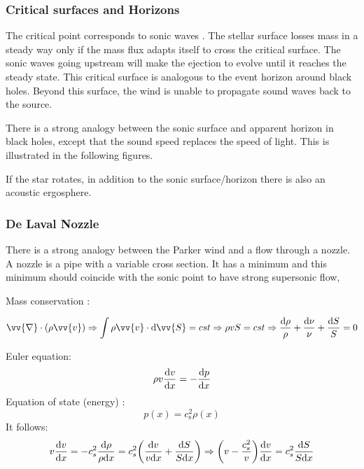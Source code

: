 \documentclass[10pt,a4paper,english]{article}
\let\originalleft\left
\let\originalright\right
\renewcommand{\left}{\mathopen{}\mathclose\bgroup\originalleft}
\renewcommand{\right}{\aftergroup\egroup\originalright}
\begin{document}
\subsubsection{Critical surfaces and Horizons}

The critical point corresponds to sonic waves . The stellar surface
losses mass in a steady way only if the mass flux adapts itself to
cross the critical surface. The sonic waves going upstream will make
the ejection to evolve until it reaches the steady state. This
critical surface is analogous to the event horizon around black
holes. Beyond this surface, the wind is unable to propagate sound
waves back to the source.

There is a strong analogy between the sonic surface and apparent
horizon in black holes, except that the sound speed replaces the speed
of light. This is illustrated in the following figures.


If the star rotates, in addition to the sonic surface/horizon there is
also an acoustic ergosphere.


\subsubsection{De Laval Nozzle}

There is a strong analogy between the Parker wind and a flow through a
nozzle. A nozzle is a pipe with a variable cross section. It has a
minimum and this minimum should coincide with the sonic point to have
strong supersonic flow,


Mass conservation :

\begin{equation}
  \vv{\nabla}\cdot(\rho\vv{v}) \Rightarrow \int \rho\vv{v}\cdot \d \vv{S} = cst \Rightarrow \rho vS = cst
  \Rightarrow \frac{\d \rho}{\rho} + \frac{\d \nu}{\nu} + \frac{\d S}{S} = 0
\end{equation}

Euler equation:
\begin{equation}
  \rho v \frac{\mathrm{d} v}{\mathrm{d} x} = -\frac{\mathrm{d} p}{\mathrm{d} x}
\end{equation}
Equation of state (energy) :
\begin{equation}
  p(x) = c_\mathrm{s}^2\rho(x)
\end{equation}
It follows:
\begin{equation}
  v\frac{\d v}{\d x} = -c_s^2\frac{\d\rho}{\rho \d x} = c_s^2\left(\frac{\d v}{v\d x}+\frac{\d S}{S\d x}\right)
  \Rightarrow \left( v - \frac{c_s^2}{v} \right)\frac{\d v}{\d x} = c_s^2\frac{\d S}{S \d x}
\end{equation}
\end{document}
